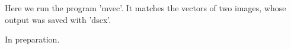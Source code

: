 Here we run the program 'mvec'. It matches the vectors of two images, whose output
was saved with 'dscx'.

In preparation.